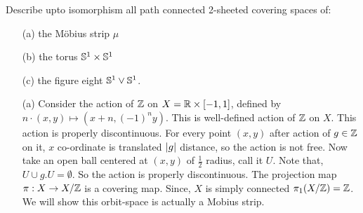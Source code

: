 \documentclass[11pt]{article}
\begin{document}
 \begin{prob}{}{}
    Describe upto isomorphism all path connected 2-sheeted covering spaces of:
\begin{enumerate}
    \item[(a)] the M\"{o}bius strip $\mu$
    \item[(b)] the torus $\s^1 \times \s^1$
    \item[(c)] the figure eight $\s^1 \vee \s^1$.   
\end{enumerate}
 \end{prob}
\sol
 \begin{itemize}
    \item[(a)]  Consider the action of $\Z$ on $X=\R \times [-1,1]$, defined by $n \cdot (x,y) \mapsto (x+n,(-1)^ny)$. This is well-defined action of $\Z$ on $X$. This action is properly discontinuous. For every point $(x,y)$ after action of $g\in \Z$ on it, $x$ co-ordinate is translated $\abs{g}$ distance, so the action is not free. Now take an open ball centered at $(x,y)$ of $\frac{1}{2}$ radius, call it $U$. Note that, $U \cup g.U =\emptyset$. So the action is properly discontinuous. The projection map $\pi : X \to X/\Z$ is a covering map. Since, $X$ is simply connected $\pi_1(X/\Z) =\Z$.  We will show this orbit-space is actually a Mobius strip. 
    
     \begin{figure}[htbp]
          \centering 

\begin{tikzpicture}[x=0.75pt,y=0.75pt,yscale=-1,xscale=1]


\end{tikzpicture}
\end{figure}
\end{itemize}
\end{document}
